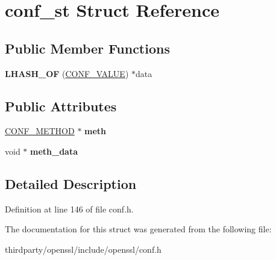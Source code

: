 \hypertarget{structconf__st}{}\section{conf\+\_\+st Struct Reference}
\label{structconf__st}
\subsection*{Public Member Functions}
\begin{DoxyCompactItemize}
\item 
\mbox{\label{structconf__st_a3797fc4b6a3018cf1dafa269a4ad1bbb}} 
{\bfseries L\+H\+A\+S\+H\+\_\+\+OF} (\hyperlink{struct_c_o_n_f___v_a_l_u_e}{C\+O\+N\+F\+\_\+\+V\+A\+L\+UE}) $\ast$data
\end{DoxyCompactItemize}
\subsection*{Public Attributes}
\begin{DoxyCompactItemize}
\item 
\mbox{\label{structconf__st_adfd637f9baf90803bf025f954be7c144}} 
\hyperlink{structconf__method__st}{C\+O\+N\+F\+\_\+\+M\+E\+T\+H\+OD} $\ast$ {\bfseries meth}
\item 
\mbox{\label{structconf__st_aecc251d785e63628b7ad0f70fa9b6122}} 
void $\ast$ {\bfseries meth\+\_\+data}
\end{DoxyCompactItemize}


\subsection{Detailed Description}


Definition at line 146 of file conf.\+h.



The documentation for this struct was generated from the following file\+:\begin{DoxyCompactItemize}
\item 
thirdparty/openssl/include/openssl/conf.\+h\end{DoxyCompactItemize}
